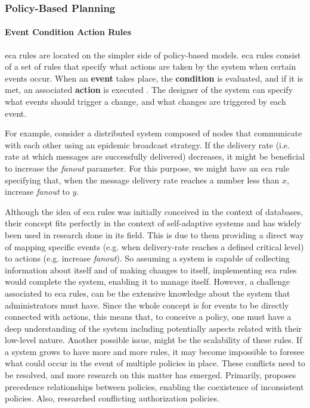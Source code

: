 \subsubsection{Policy-Based Planning}
\paragraph{Event Condition Action Rules}
\label{par:ecarules}
\gls{eca} rules are located on the simpler side of policy-based models. \gls{eca} rules consist of a set of rules that specify what actions are taken by the system when certain events occur. When an \textbf{event} takes place, the \textbf{condition} is evaluated, and if it is met, an associated \textbf{action} is executed \cite{Mccarthy1989}. The designer of the system can specify what events should trigger a change, and what changes are triggered by each event.
\par For example, consider a distributed system composed of nodes that communicate with each other using an epidemic broadcast strategy. If the delivery rate (i.e. rate at which messages are successfully delivered) decreases, it might be beneficial to increase the \textit{fanout} parameter. For this purpose, we might have an \gls{eca} rule specifying that, when the message delivery rate reaches a number less than $x$, increase \textit{fanout} to $y$.
\par Although the idea of \gls{eca} rules was initially conceived in the context of databases, their concept fits perfectly in the context of self-adaptive systems and has widely been used in research done in its field. This is due to them providing a direct way of mapping specific events (e.g. when delivery-rate reaches a defined critical level) to actions (e.g. increase \textit{fanout}). So assuming a system is capable of collecting information about itself and of making changes to itself, implementing \gls{eca} rules would complete the system, enabling it to manage itself. However, a challenge associated to \gls{eca} rules, can be the extensive knowledge about the system that administrators must have. Since the whole concept is for events to be directly connected with actions, this means that, to conceive a policy, one must have a deep understanding of the system including potentially aspects related with their low-level nature. Another possible issue, might be the scalability of these rules. If a system grows to have more and more rules, it may become impossible to foresee what could occur in the event of multiple policies in place. These conflicts need to be resolved, and more research on this matter has emerged. Primarily, \cite{Lupu1999} proposes precedence relationships between policies, enabling the coexistence of inconsistent policies. Also, \cite{Kamoda2005} researched conflicting authorization policies.

